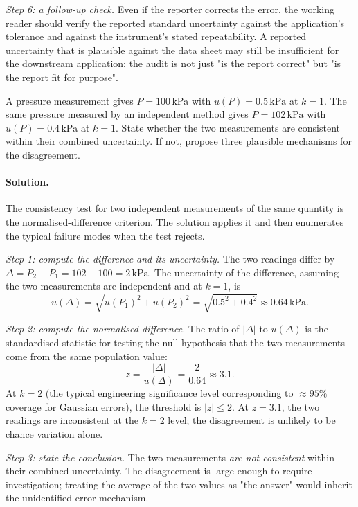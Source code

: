 \emph{Step 6: a follow-up check.} Even if the reporter corrects
the error, the working reader should verify the reported standard
uncertainty against the application's tolerance and against the
instrument's stated repeatability. A reported uncertainty that is
plausible against the data sheet may still be insufficient for the
downstream application; the audit is not just "is the report
correct" but "is the report fit for purpose".

\begin{exercise}
A pressure measurement gives $P = 100 \,\si{\kilo\pascal}$ with
$u(P) = 0.5 \,\si{\kilo\pascal}$ at $k = 1$. The same pressure
measured by an independent method gives $P = 102 \,\si{\kilo\pascal}$
with $u(P) = 0.4 \,\si{\kilo\pascal}$ at $k = 1$. State whether
the two measurements are consistent within their combined
uncertainty. If not, propose three plausible mechanisms for the
disagreement.
\end{exercise}

\paragraph{Solution.}
The consistency test for two independent measurements of the same
quantity is the normalised-difference criterion. The solution
applies it and then enumerates the typical failure modes when the
test rejects.

\emph{Step 1: compute the difference and its uncertainty.} The
two readings differ by $\Delta = P_{2} - P_{1} = 102 - 100 =
2\,\si{\kilo\pascal}$. The uncertainty of the difference,
assuming the two measurements are independent and at $k = 1$, is
\[
u(\Delta) = \sqrt{u(P_{1})^{2} + u(P_{2})^{2}} =
\sqrt{0.5^{2} + 0.4^{2}} \approx 0.64\,\si{\kilo\pascal}.
\]

\emph{Step 2: compute the normalised difference.} The ratio of
$|\Delta|$ to $u(\Delta)$ is the standardised statistic for
testing the null hypothesis that the two measurements come from
the same population value:
\[
z = \frac{|\Delta|}{u(\Delta)} = \frac{2}{0.64} \approx 3.1.
\]
At $k = 2$ (the typical engineering significance level
corresponding to $\approx 95\%$ coverage for Gaussian errors), the
threshold is $|z| \leq 2$. At $z = 3.1$, the two readings are
inconsistent at the $k = 2$ level; the disagreement is unlikely
to be chance variation alone.

\emph{Step 3: state the conclusion.} The two measurements
\emph{are not consistent} within their combined uncertainty. The
disagreement is large enough to require investigation; treating
the average of the two values as "the answer" would inherit the
unidentified error mechanism.

